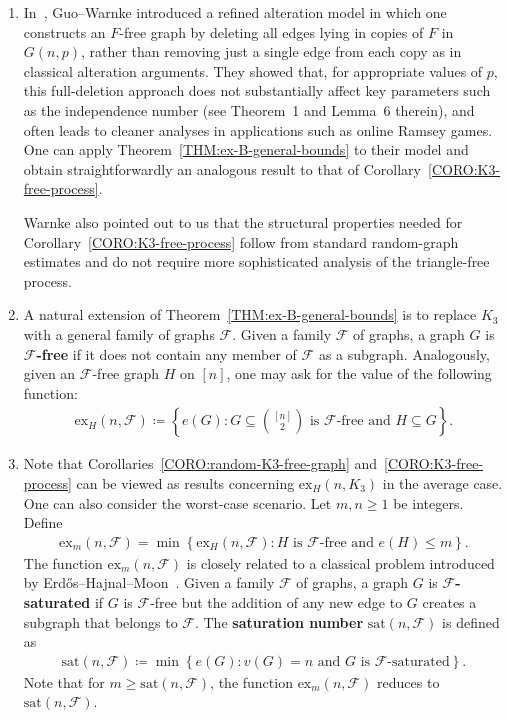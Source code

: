 \documentclass[11pt,a4paper]{article}
\newcommand{\graph}{H}
\begin{document}
\begin{enumerate}
\item  In~\cite{GL23}, Guo--Warnke introduced a refined alteration model in which one constructs an $F$-free graph by deleting all edges lying in copies of $F$ in $G(n,p)$, rather than removing just a single edge from each copy as in classical alteration arguments. They showed that, for appropriate values of $p$, this full-deletion approach does not substantially affect key parameters such as the independence number (see Theorem~1 and Lemma~6 therein), and often leads to cleaner analyses in applications such as online Ramsey games.
One can apply Theorem~\ref{THM:ex-B-general-bounds} to their model and obtain straightforwardly an analogous result to that of Corollary~\ref{CORO:K3-free-process}. 

Warnke also pointed out to us that the structural properties needed for Corollary~\ref{CORO:K3-free-process} follow from standard random-graph estimates and do not require more sophisticated analysis of the triangle-free process.



\item A natural extension of Theorem~\ref{THM:ex-B-general-bounds} is to replace $K_3$ with a general family of graphs $\mathcal{F}$. 
Given a family $\mathcal{F}$ of graphs, a graph $G$ is \textbf{$\mathcal{F}$-free} if it does not contain any member of $\mathcal{F}$ as a subgraph.  
Analogously, given an $\mathcal{F}$-free graph $\graph$ on $[n]$, one may ask for the value of the following function: 
\begin{align*}
    \mathrm{ex}_{\graph}(n,\mathcal{F})
    \coloneqq \left\{e(G) \colon \text{$G \subseteq \binom{[n]}{2}$ is $\mathcal{F}$-free and $\graph \subseteq G$}\right\}.
\end{align*}


\item Note that Corollaries~\ref{CORO:random-K3-free-graph} and~\ref{CORO:K3-free-process} can be viewed as results concerning $\mathrm{ex}_{\graph}(n,K_{3})$ in the average case. 
One can also consider the worst-case scenario. 
Let $m, n \ge 1$ be integers. Define 
\begin{align*}
    \mathrm{ex}_{m}(n,\mathcal{F}) 
    = \min\left\{ \mathrm{ex}_{\graph}(n,\mathcal{F}) \colon \text{$\graph$ is $\mathcal{F}$-free and $e(\graph) \le m$} \right\}.
\end{align*}
%
The function $\mathrm{ex}_{m}(n,\mathcal{F})$ is closely related to a classical problem introduced by Erd{\H o}s--Hajnal--Moon~\cite{EHM64}. 
Given a family $\mathcal{F}$ of graphs, a graph $G$ is \textbf{$\mathcal{F}$-saturated} if $G$ is $\mathcal{F}$-free but the addition of any new edge to $G$ creates a subgraph that belongs to $\mathcal{F}$. 
The \textbf{saturation number} $\mathrm{sat}(n,\mathcal{F})$ is defined as 
\begin{align*}
    \mathrm{sat}(n,\mathcal{F})
    \coloneqq \min\left\{e(G) \colon \text{$v(G) = n$ and $G$ is $\mathcal{F}$-saturated}\right\}.
\end{align*}
%
Note that for $m \ge \mathrm{sat}(n,\mathcal{F})$, the function $\mathrm{ex}_{m}(n,\mathcal{F})$ reduces to $\mathrm{sat}(n,\mathcal{F})$.  


\end{enumerate}
\end{document}

